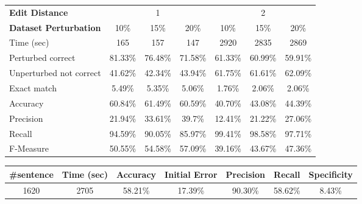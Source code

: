 \begin{figure}[H]
	\centering
	\begin{tabular}{lccc|ccc}
		\toprule
		\textbf{Edit Distance} & \multicolumn{3}{c|}{1} & \multicolumn{3}{c}{2}\\
		\textbf{Dataset Perturbation} & \num{10}\% & \num{15}\%& \num{20}\% & \num{10}\% & \num{15}\%& 
		\num{20}\% \\
		\midrule
		Time (sec) &\num{165}&\num{157}& \num{147}&\num{2920}&\num{2835}&\num{2869}\\
		\midrule
		Perturbed correct & \num{81,33}\% &\num{76,48}\%& \num{71,58}\%& \num{61,33}\% 
		&\num{60,99}\% 
		&\num{59,91}\%\\
		Unperturbed not correct &\num{41,62}\%&\num{42,34}\% & \num{43,94}\% & \num{61,75}\% & 
		\num{61,61}\% & 
		\num{62,09}\%\\
		Exact match &\num{5,49}\%&\num{5,35}\%&\num{5,06}\%&\num{1,76}\%&\num{2,06}\%&\num{2,06}\%\\
		Accuracy &\num{60,84}\% &\num{61,49}\% &\num{60,59}\% &\num{40,70}\% &\num{43,08}\% 
		&\num{44,39}\% \\
		Precision&\num{21,94}\%&\num{33,61}\% &\num{39,7}\%&\num{12,41}\%&\num{21,22}\%&\num{27,06}\%\\
		Recall&\num{94,59}\%&\num{90,05}\%&\num{85,97}\%&\num{99,41}\%&\num{98,58}\%&\num{97,71}\%\\
		F-Measure&\num{50,55}\%&\num{54,58}\%&\num{57,09}\%&\num{39,16}\%&\num{43,67}\%&\num{47,36}\%\\
		\bottomrule
	\end{tabular}
	\label{tab:sentence-eval3a}
\end{figure}


\begin{figure}[H]
	\centering
	\begin{tabular}{ccccccc}
		\toprule
		\#sentence & Time (sec)  & Accuracy & Initial Error  &  Precision & Recall & Specificity \\
		\midrule
		\num{1620}	& \num{2705}  & \num{58,21}\%  & \num{17,39}\% & \num{90,30}\% & \num{58,62}\%  & 
		\num{8,43}\%  
		\\
		\bottomrule
	\end{tabular}
	\label{tab:sentence-eval3}
\end{figure}